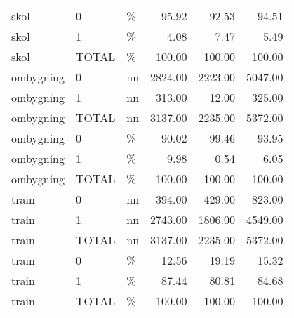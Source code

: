 \begin{longtable}[t]{lllrrr}
skol & 0 & \% & 95.92 & 92.53 & 94.51\\
skol & 1 & \% & 4.08 & 7.47 & 5.49\\
skol & TOTAL & \% & 100.00 & 100.00 & 100.00\\
ombygning & 0 & nn & 2824.00 & 2223.00 & 5047.00\\
ombygning & 1 & nn & 313.00 & 12.00 & 325.00\\
ombygning & TOTAL & nn & 3137.00 & 2235.00 & 5372.00\\
ombygning & 0 & \% & 90.02 & 99.46 & 93.95\\
ombygning & 1 & \% & 9.98 & 0.54 & 6.05\\
ombygning & TOTAL & \% & 100.00 & 100.00 & 100.00\\
train & 0 & nn & 394.00 & 429.00 & 823.00\\
train & 1 & nn & 2743.00 & 1806.00 & 4549.00\\
train & TOTAL & nn & 3137.00 & 2235.00 & 5372.00\\
train & 0 & \% & 12.56 & 19.19 & 15.32\\
train & 1 & \% & 87.44 & 80.81 & 84.68\\
train & TOTAL & \% & 100.00 & 100.00 & 100.00\\*
\end{longtable}
\endgroup{}
